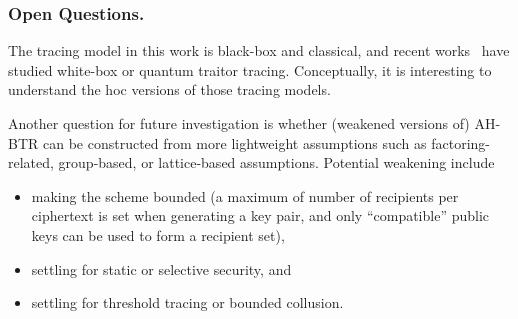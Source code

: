 \subsubsection{Open Questions.}
The tracing model in this work is black-box and classical, and recent works~\cite{C:Zhandry21,TCC:Zhandry20} have studied white-box or quantum traitor tracing.
Conceptually, it is interesting to understand the \ad hoc versions of those tracing models.

Another question for future investigation is whether
(weakened versions of) AH-BTR can be constructed from more lightweight assumptions such as factoring-related, group-based, or lattice-based assumptions.
Potential weakening include
\begin{itemize}
\item making the scheme bounded (a maximum of number of recipients per ciphertext is set when generating a key pair, and only ``compatible'' public keys can be used to form a recipient set),
\item settling for static or selective security, and
\item settling for threshold tracing or bounded collusion.
\end{itemize}
